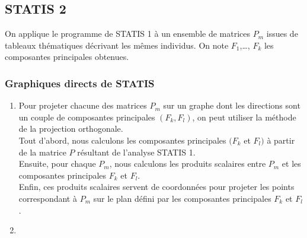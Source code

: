 \documentclass[
]{article}
\begin{document}
\hypertarget{statis-2}{%
\subsection{STATIS 2}\label{statis-2}}

On applique le programme de STATIS 1 à un ensemble de matrices \(P_m\)
issues de tableaux thématiques décrivant les mêmes individus. On note
\(F_1\),\ldots, \(F_k\) les composantes principales obtenues.

\hypertarget{graphiques-directs-de-statis}{%
\subsubsection{Graphiques directs de
STATIS}\label{graphiques-directs-de-statis}}

\begin{enumerate}
\def\labelenumi{\alph{enumi})}
\item
  Pour projeter chacune des matrices \(P_m\) sur un graphe dont les
  directions sont un couple de composantes principales \((F_k,F_l)\), on
  peut utiliser la méthode de la projection orthogonale.\\
  Tout d'abord, nous calculons les composantes principales \((F_k\) et
  \(F_l)\) à partir de la matrice \(P\) résultant de l'analyse STATIS
  1.\\
  Ensuite, pour chaque \(P_m\), nous calculons les produits scalaires
  entre \(P_m\) et les composantes principales \(F_k\) et \(F_l\).\\
  Enfin, ces produits scalaires servent de coordonnées pour projeter les
  points correspondant à \(P_m\) sur le plan défini par les composantes
  principales \(F_k\) et \(F_l\).
\item
\end{enumerate}
\end{document}

